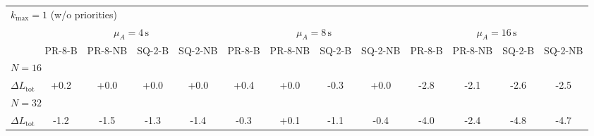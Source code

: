 \begin{tabular}{l c c c c c c c c c c c c}
\toprule
\multicolumn{13}{l}{$k_{\max}=1$ (w/o priorities)} \\
\addlinespace[0.2em]
 & \multicolumn{4}{c}{$\mu_A=4\,\mathrm{s}$} & \multicolumn{4}{c}{$\mu_A=8\,\mathrm{s}$} & \multicolumn{4}{c}{$\mu_A=16\,\mathrm{s}$} \\
\cmidrule(lr){2-5}\cmidrule(lr){6-9}\cmidrule(lr){10-13}
 & PR-8-B & PR-8-NB & SQ-2-B & SQ-2-NB & PR-8-B & PR-8-NB & SQ-2-B & SQ-2-NB & PR-8-B & PR-8-NB & SQ-2-B & SQ-2-NB \\
\midrule
\multicolumn{13}{l}{${N=16}$} \\
\midrule
$\Delta L_{\mathrm{tot}}$ & +0.2 & +0.0 & +0.0 & +0.0 & +0.4 & +0.0 & -0.3 & +0.0 & -2.8 & -2.1 & -2.6 & -2.5 \\
\midrule
\multicolumn{13}{l}{${N=32}$} \\
\midrule
$\Delta L_{\mathrm{tot}}$ & -1.2 & -1.5 & -1.3 & -1.4 & -0.3 & +0.1 & -1.1 & -0.4 & -4.0 & -2.4 & -4.8 & -4.7 \\
\bottomrule
\end{tabular}

